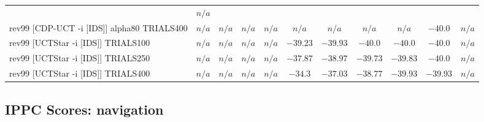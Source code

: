 \documentclass{article}
\begin{document}
\begin{tabular}{|l|r@{$\pm$}rr@{$\pm$}rr@{$\pm$}rr@{$\pm$}rr@{$\pm$}rr@{$\pm$}rr@{$\pm$}rr@{$\pm$}rr@{$\pm$}rr@{$\pm$}r|}
& \multicolumn{2}{c|}{\textbf{$n/a$}}
\\
rev99 [CDP-UCT -i [IDS]] alpha80 TRIALS400
& \multicolumn{2}{c}{\textbf{$n/a$}}
& \multicolumn{2}{c}{\textbf{$n/a$}}
& \multicolumn{2}{c}{\textbf{$n/a$}}
& \multicolumn{2}{c}{\textbf{$n/a$}}
& \multicolumn{2}{c}{\textbf{$n/a$}}
& \multicolumn{2}{c}{\textbf{$n/a$}}
& \multicolumn{2}{c}{\textbf{$n/a$}}
& \multicolumn{2}{c}{\textbf{$n/a$}}
& \multicolumn{2}{c}{$-40.0$}
& \multicolumn{2}{c|}{\textbf{$n/a$}}
\\
rev99 [UCTStar -i [IDS]] TRIALS100
& \multicolumn{2}{c}{\textbf{$n/a$}}
& \multicolumn{2}{c}{\textbf{$n/a$}}
& \multicolumn{2}{c}{\textbf{$n/a$}}
& \multicolumn{2}{c}{\textbf{$n/a$}}
& \multicolumn{2}{c}{$-39.23$}
& \multicolumn{2}{c}{$-39.93$}
& \multicolumn{2}{c}{$-40.0$}
& \multicolumn{2}{c}{$-40.0$}
& \multicolumn{2}{c}{$-40.0$}
& \multicolumn{2}{c|}{\textbf{$n/a$}}
\\
rev99 [UCTStar -i [IDS]] TRIALS250
& \multicolumn{2}{c}{\textbf{$n/a$}}
& \multicolumn{2}{c}{\textbf{$n/a$}}
& \multicolumn{2}{c}{\textbf{$n/a$}}
& \multicolumn{2}{c}{\textbf{$n/a$}}
& \multicolumn{2}{c}{$-37.87$}
& \multicolumn{2}{c}{$-38.97$}
& \multicolumn{2}{c}{$-39.73$}
& \multicolumn{2}{c}{$-39.83$}
& \multicolumn{2}{c}{$-40.0$}
& \multicolumn{2}{c|}{\textbf{$n/a$}}
\\
rev99 [UCTStar -i [IDS]] TRIALS400
& \multicolumn{2}{c}{\textbf{$n/a$}}
& \multicolumn{2}{c}{\textbf{$n/a$}}
& \multicolumn{2}{c}{\textbf{$n/a$}}
& \multicolumn{2}{c}{\textbf{$n/a$}}
& \multicolumn{2}{c}{$-34.3$}
& \multicolumn{2}{c}{$-37.03$}
& \multicolumn{2}{c}{$-38.77$}
& \multicolumn{2}{c}{$-39.93$}
& \multicolumn{2}{c}{$-39.93$}
& \multicolumn{2}{c|}{\textbf{$n/a$}}
\\
\hline
\end{tabular}%

\bigskip

\subsection*{IPPC Scores: navigation}
\end{document}
